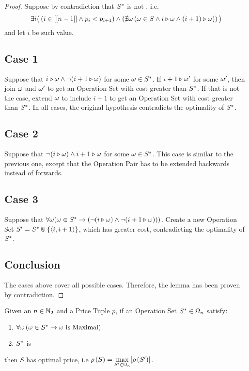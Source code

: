 \begin{proof}
    Suppose by contradiction that $S^{*}$ is not \great, i.e.
    \begin{equation}
        \exists i \big(
            \left( i \in \left[\left[ n-1 \right]\right] \land p_{i} < p_{i+1}  \right)
            \land
            \left( \nexists \omega \left(
                \omega \in S \land i \triangleright \omega \land (i+1) \triangleright \omega
            \right) \right)
        \big)
    \end{equation}
    and let $i$ be such value.

    \subsection*{Case 1}
    Suppose that $i \triangleright \omega \land \neg (i+1 \triangleright \omega)$ for some $\omega \in S^{*}$. If $i+1 \triangleright \omega'$ for some $\omega'$, then join $\omega$ and $\omega'$ to get an Operation Set with cost greater than $S^{*}$. If that is not the case, extend $\omega$ to include $i+1$ to get an Operation Set with cost greater than $S^{*}$. In all cases, the original hypothesis contradicts the optimality of $S^{*}$.

    \subsection*{Case 2}
    Suppose that $\neg (i \triangleright \omega) \land i+1 \triangleright \omega$ for some $\omega \in S^{*}$. This case is similar to the previous one, except that the Operation Pair has to be extended backwards instead of forwards.

    \subsection*{Case 3}
    Suppose that $\forall \omega (\omega \in S^{*} \rightarrow (\neg (i \triangleright \omega) \land \neg (i+1 \triangleright \omega)))$. Create a new Operation Set $S' = S^{*} \Cup \left\{ \left\langle i, i+1 \right\rangle \right\}$, which has greater cost, contradicting the optimality of $S^{*}$.

    \subsection*{Conclusion}
    The cases above cover all possible cases. Therefore, the lemma has been proven by contradiction.
\end{proof}

\begin{lemma}
    \label{lemma:opt-price-III}
    Given an $n \in \mathbb{N}_{2}$ and a Price Tuple $p$, if an Operation Set $S^{*} \in \Omega_{n}$ satisfy:
    \begin{enumerate}
        \item $\forall \omega \left(
            \omega \in S^{*} \rightarrow \omega \mbox{ is Maximal}
        \right)$
        \item $S^{*}$ is \great
    \end{enumerate}
    then $S$ has optimal price, i.e $ \rho\left( S \right) = \max\limits_{S' \in \Omega_{n}} [\rho\left( S' \right)] $.
\end{lemma}

